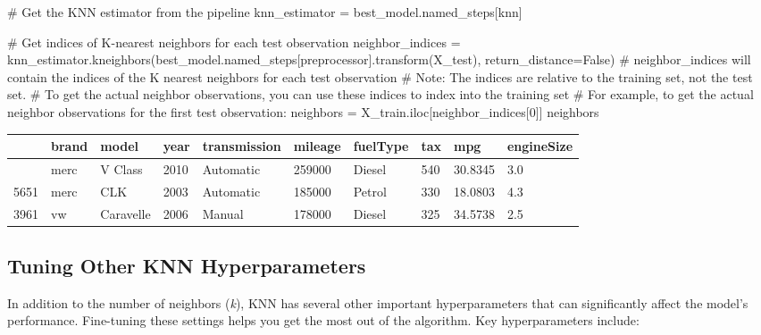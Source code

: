 \documentclass[
  letterpaper,
  DIV=11,
  numbers=noendperiod]{scrreprt}
\newenvironment{Shaded}{\begin{snugshade}}{\end{snugshade}}
\newcommand{\CommentTok}[1]{\textcolor[rgb]{0.37,0.37,0.37}{#1}}
\newcommand{\DecValTok}[1]{\textcolor[rgb]{0.68,0.00,0.00}{#1}}
\newcommand{\NormalTok}[1]{\textcolor[rgb]{0.00,0.23,0.31}{#1}}
\newcommand{\OperatorTok}[1]{\textcolor[rgb]{0.37,0.37,0.37}{#1}}
\newcommand{\StringTok}[1]{\textcolor[rgb]{0.13,0.47,0.30}{#1}}
\newcommand{\VariableTok}[1]{\textcolor[rgb]{0.07,0.07,0.07}{#1}}
\begin{document}
\begin{Shaded}
\begin{Highlighting}[]
\CommentTok{\# Get the KNN estimator from the pipeline}
\NormalTok{knn\_estimator }\OperatorTok{=}\NormalTok{ best\_model.named\_steps[}\StringTok{\textquotesingle{}knn\textquotesingle{}}\NormalTok{]}

\CommentTok{\# Get indices of K{-}nearest neighbors for each test observation}
\NormalTok{neighbor\_indices }\OperatorTok{=}\NormalTok{ knn\_estimator.kneighbors(best\_model.named\_steps[}\StringTok{\textquotesingle{}preprocessor\textquotesingle{}}\NormalTok{].transform(X\_test), }
\NormalTok{                                           return\_distance}\OperatorTok{=}\VariableTok{False}\NormalTok{)}
\CommentTok{\# neighbor\_indices will contain the indices of the K nearest neighbors for each test observation}
\CommentTok{\# Note: The indices are relative to the training set, not the test set.}
\CommentTok{\# To get the actual neighbor observations, you can use these indices to index into the training set}
\CommentTok{\# For example, to get the actual neighbor observations for the first test observation:}
\NormalTok{neighbors }\OperatorTok{=}\NormalTok{ X\_train.iloc[neighbor\_indices[}\DecValTok{0}\NormalTok{]]}
\NormalTok{neighbors}
\end{Highlighting}
\end{Shaded}

\begin{longtable}[]{@{}llllllllll@{}}
\toprule\noalign{}
& brand & model & year & transmission & mileage & fuelType & tax & mpg &
engineSize \\
\midrule\noalign{}
\endhead
\bottomrule\noalign{}
\endlastfoot
4580 & merc & V Class & 2010 & Automatic & 259000 & Diesel & 540 &
30.8345 & 3.0 \\
5651 & merc & CLK & 2003 & Automatic & 185000 & Petrol & 330 & 18.0803 &
4.3 \\
3961 & vw & Caravelle & 2006 & Manual & 178000 & Diesel & 325 & 34.5738
& 2.5 \\
\end{longtable}

\subsection{Tuning Other KNN
Hyperparameters}\label{tuning-other-knn-hyperparameters}

In addition to the number of neighbors (\emph{k}), KNN has several other
important hyperparameters that can significantly affect the model's
performance. Fine-tuning these settings helps you get the most out of
the algorithm. Key hyperparameters include:
\end{document}
